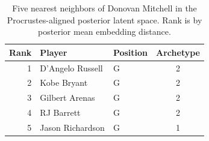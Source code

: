 \begin{table}[htbp]
  \centering\small
  \begin{tabular}{rllc}
    \toprule
    Rank & Player & Position & Archetype \\
    \midrule
    1 & D'Angelo Russell & G & 2 \\
    2 & Kobe Bryant & G & 2 \\
    3 & Gilbert Arenas & G & 2 \\
    4 & RJ Barrett & G & 2 \\
    5 & Jason Richardson & G & 1 \\
    \bottomrule
  \end{tabular}
  \caption{Five nearest neighbors of Donovan Mitchell in the Procrustes-aligned posterior latent space. Rank is by posterior mean embedding distance.}
  \label{tab:Donovan_Mitchell_neighbors}
\end{table}

